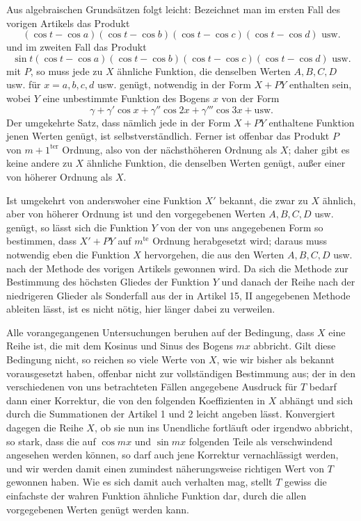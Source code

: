 \begingroup
\renewcommand{\arraystretch}{1.45}
Aus algebraischen Grundsätzen folgt leicht: Bezeichnet man im ersten Fall des vorigen Artikels das Produkt
\[
(\cos t-\cos a)(\cos t-\cos b)(\cos t-\cos c)(\cos t-\cos d)\text{ usw.}
\]
und im zweiten Fall das Produkt
\[
\sin t(\cos t-\cos a)(\cos t-\cos b)(\cos t-\cos c)(\cos t-\cos d)\text{ usw.}
\]
mit \(P\), so muss jede zu \(X\) ähnliche Funktion, die denselben Werten
\(A,B,C,D\) usw. für \(x=a,b,c,d\) usw. genügt, notwendig in der Form \(X+PY\)
enthalten sein, wobei \(Y\) eine unbestimmte Funktion des Bogens \(x\) von der Form
\[
\gamma+\gamma'\cos x+\gamma''\cos 2x+\gamma'''\cos 3x+\text{usw.}
\]
Der umgekehrte Satz, dass nämlich jede in der Form \(X+PY\) enthaltene Funktion jenen Werten genügt, ist selbstverständlich. Ferner ist offenbar das Produkt
\(P\) von \(m+1^{\mathrm{ter}}\) Ordnung, also von der nächsthöheren Ordnung als \(X\); daher gibt es keine andere zu
\(X\) ähnliche Funktion, die denselben Werten genügt, außer einer von höherer Ordnung
als \(X\).

Ist umgekehrt von anderswoher eine Funktion \(X'\) bekannt, die zwar zu \(X\) ähnlich, aber von höherer Ordnung ist
und den vorgegebenen Werten \(A,B,C,D\) usw. genügt, so lässt sich die Funktion \(Y\)
von der von uns angegebenen Form so bestimmen, dass \(X'+PY\) auf
\endgroup
\begingroup
\renewcommand{\arraystretch}{1.45}
\noindent
\(m^{\mathrm{te}}\) Ordnung herabgesetzt wird; daraus muss notwendig eben die Funktion \(X\) hervorgehen, die aus den Werten \(A,B,C,D\) usw.
nach der Methode des vorigen Artikels gewonnen wird. Da sich die Methode zur Bestimmung des höchsten Gliedes
der Funktion \(Y\) und danach der Reihe nach der niedrigeren Glieder als Sonderfall
aus der in Artikel 15, II angegebenen Methode ableiten lässt, ist es nicht nötig, hier
länger dabei zu verweilen.

Alle vorangegangenen Untersuchungen beruhen auf der Bedingung, dass \(X\) eine Reihe ist, die mit dem Kosinus und Sinus des Bogens \(mx\) abbricht. Gilt diese Bedingung
nicht, so reichen so viele Werte von \(X\), wie wir bisher als bekannt vorausgesetzt haben, offenbar nicht
zur vollständigen Bestimmung aus; der in den verschiedenen von uns betrachteten Fällen angegebene Ausdruck für \(T\) bedarf dann einer Korrektur, die von den folgenden Koeffizienten
in \(X\) abhängt und sich durch die Summationen der Artikel 1 und 2 leicht angeben lässt. Konvergiert dagegen
die Reihe \(X\), ob sie nun ins Unendliche fortläuft oder irgendwo abbricht, so stark,
dass die auf \(\cos mx\) und \(\sin mx\) folgenden Teile als verschwindend angesehen werden können,
so darf auch jene Korrektur vernachlässigt werden, und wir werden damit einen zumindest näherungsweise
richtigen Wert von \(T\) gewonnen haben. Wie es sich damit auch verhalten mag, stellt \(T\) gewiss die einfachste der wahren Funktion ähnliche Funktion
dar, durch die allen vorgegebenen Werten genügt werden kann.

\endgroup
